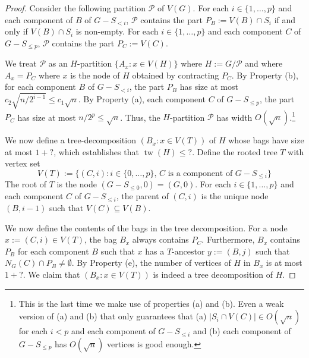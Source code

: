 \documentclass{patmorin}
\renewcommand{\le}{\leqslant}
\DeclareMathOperator{\tw}{tw}
\begin{document}
\begin{proof}
  Consider the following partition $\mathcal{P}$ of $V(G)$.  For each $i\in\{1,\ldots,p\}$ and each component of $B$ of $G-S_{< i}$, $\mathcal{P}$ contains the part $P_B:=V(B)\cap S_i$ if and only if $V(B)\cap S_i$ is non-empty. For each $i\in\{1,\ldots,p\}$ and each component $C$ of $G-S_{\le p}$, $\mathcal{P}$ contains the part $P_C:=V(C)$.

  We treat $\mathcal{P}$ as an $H$-partition $\{A_x:x\in V(H)\}$ where $H:=G/\mathcal{P}$ and where $A_x=P_C$ where $x$ is the node of $H$ obtained by contracting $P_C$.  By Property (b), for each component $B$ of $G-S_{<i}$, the part $P_{B}$ has size at most $c_2\sqrt{n/2^{i-1}}\le c_1\sqrt{n}$. By Property (a), each component $C$ of $G-S_{\le p}$, the part $P_C$ has size at most $n/2^p \le \sqrt{n}$.   Thus, the $H$-partition $\mathcal{P}$ has width $O(\sqrt{n})$.\footnote{This is the last time we make use of properties (a) and (b).  Even a weak version of (a) and (b) that only guarantees that (a) $|S_i\cap V(C)|\in O(\sqrt{n})$ for each $i<p$  and each component of $G-S_{\le i}$ and (b) each component of $G-S_{\le p}$ has $O(\sqrt{n})$ vertices is good enough.}

  We now define a tree-decomposition $(B_x:x\in V(T))$ of $H$ whose bags have size at most $1+{?}$, which establishes that $\tw(H)\le {?}$.  Define the rooted tree $T$ with vertex set
  \[
    V(T):=\{(C,i): i\in\{0,\ldots,p\},\, \text{$C$ is a component of $G-S_{\le i}$} \}
  \]
  The root of $T$ is the node $(G-S_{\le 0},0)=(G,0)$. For each $i\in\{1,\ldots,p\}$ and each component $C$ of $G-S_{\le i}$, the parent of $(C,i)$ is the unique node $(B,i-1)$ such that $V(C)\subseteq V(B)$.

  We now define the contents of the bags in the tree decomposition.  For a node $x:=(C,i)\in V(T)$, the bag $B_{x}$ always contains $P_C$.  Furthermore, $B_x$ contains $P_B$ for each component $B$ such that $x$ has a $T$-ancestor  $y:=(B,j)$ such that $N_G(C)\cap P_B\neq\emptyset$.  By Property (e), the number of vertices of $H$ in $B_x$ is at most $1+{?}$.  We claim that $(B_x:x\in V(T))$ is indeed a tree decomposition of $H$.



\end{proof}
\end{document}
